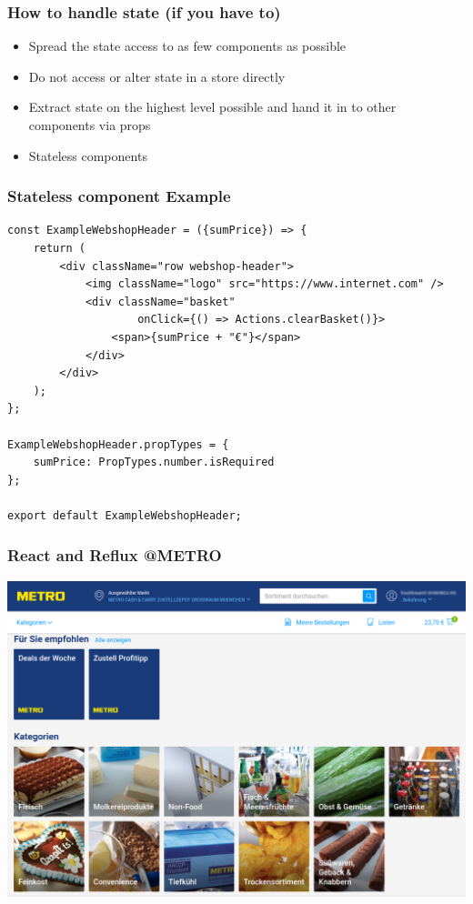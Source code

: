 \documentclass{beamer}
\begin{document}
\begin{frame}\frametitle{How to handle state (if you have to)}
\begin{itemize}
\item Spread the state access to as few components as possible
\item Do not access or alter state in a store directly
\item Extract state on the highest level possible and hand it in to other components via props
\item Stateless components
\end{itemize}
\end{frame}

\begin{frame}[fragile]\frametitle{Stateless component \textendash{} Example}
\begin{lstlisting}[style=htmlcssjs]
const ExampleWebshopHeader = ({sumPrice}) => {
    return (
        <div className="row webshop-header">
            <img className="logo" src="https://www.internet.com" />
            <div className="basket" 
                    onClick={() => Actions.clearBasket()}>
                <span>{sumPrice + "€"}</span>
            </div>
        </div>
    );
};

ExampleWebshopHeader.propTypes = {
    sumPrice: PropTypes.number.isRequired
};

export default ExampleWebshopHeader;
\end{lstlisting}
\end{frame}

\begin{frame}\frametitle{React and Reflux @METRO}
\centering
\includegraphics[width=.85\linewidth,height=.85\textheight,keepaspectratio]{pics/betty.png}
\end{frame}
\end{document}
